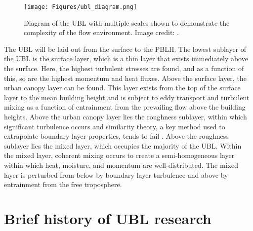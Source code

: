 \begin{figure}[ht]
	\centering
	\texttt{[image: Figures/ubl\_diagram.png]}
	\caption{Diagram of the UBL with multiple scales shown to demonstrate the complexity of the flow environment. Image credit: \citet{rotach2005bubble}.}
	\label{fig:ubl_diagram}
\end{figure}

The UBL will be laid out from the surface to the PBLH. The lowest sublayer of the UBL is the surface layer, which is a thin layer that exists immediately above the surface. Here, the highest turbulent stresses are found, and as a function of this, so are the highest momentum and heat fluxes. Above the surface layer, the urban canopy layer can be found. This layer exists from the top of the surface layer to the mean building height and is subject to eddy transport and turbulent mixing as a function of entrainment from the prevailing flow above the building heights. Above the urban canopy layer lies the roughness sublayer, within which significant turbulence occurs and similarity theory, a key method used to extrapolate boundary layer properties, tends to fail \citep{harman2007simple}. Above the roughness sublayer lies the mixed layer, which occupies the majority of the UBL. Within the mixed layer, coherent mixing occurs to create a semi-homogeneous layer within which heat, moisture, and momentum are well-distributed. The mixed layer is perturbed from below by boundary layer turbulence and above by entrainment from the free troposphere.

\FloatBarrier

\section{Brief history of UBL research}
\label{sec:history}

